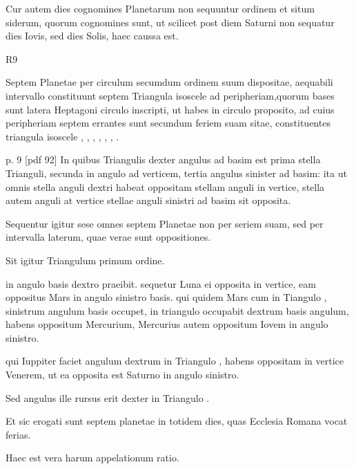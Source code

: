 Cur autem dies cognomines Planetarum non sequuntur ordinem et
situm siderum, quorum cognomines sunt, ut scilicet post diem Saturni
non sequatur dies Iovis, sed dies Solis, haec caussa est.

\begin{wrapfigure}[9]{R}{9\baselineskip}
  \centering
  \def\svgwidth{9\baselineskip}
  {\astrofont}
\end{wrapfigure}

Septem Planetae
per circulum secumdum ordinem suum
dispositae, aequabili intervallo constituunt septem
Triangula isoscele ad peripheriam,quorum
bases sunt latera Heptagoni circulo inscripti,
ut habes in circulo proposito, ad cuius
peripheriam septem errantes sunt secundum
feriem suam sitae, constituentes triangula
isoscele , , ,
 , , , .

p. 9 [pdf 92]
%
In quibus Triangulis dexter angulus ad basim
est prima stella Trianguli, secunda in angulo ad verticem, tertia angulus
sinister ad basim: ita ut omnis stella anguli dextri habeat oppositam
stellam anguli in vertice, stella autem anguli at vertice stellae
anguli sinistri ad basim sit opposita.

Sequentur igitur sese omnes septem
Planetae non per seriem suam, sed per intervalla laterum, quae
verae sunt oppositiones.

Sit igitur Triangulum  primum ordine.

 in angulo basis dextro praeibit. sequetur Luna ei opposita in vertice,
eam oppositus Mars in angulo sinistro basis. qui quidem Mars cum in
Tiangulo , sinistrum angulum basis occupet,
 in triangulo  occupabit
dextrum basis angulum, habens oppositum Mercurium,
Mercurius autem oppositum Iovem in angulo sinistro.

qui Iuppiter
faciet angulum dextrum in Triangulo , habens oppositam in vertice
Venerem, ut ea opposita est Saturno in angulo sinistro.

Sed angulus
ille rursus erit dexter in Triangulo .

Et sic erogati sunt septem
planetae in totidem dies, quas Ecclesia Romana vocat ferias.

Haec est vera harum appelationum ratio.


